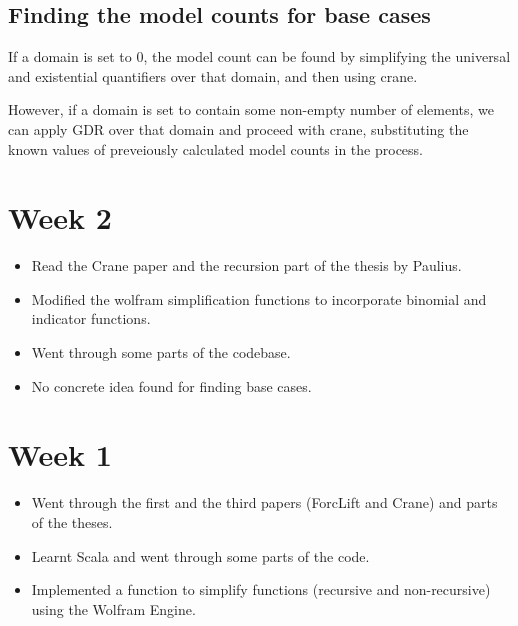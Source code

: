 \documentclass[12pt]{report}
\begin{document}
    \section*{Finding the model counts for base cases}
    If a domain is set to $0$, the model count can be found by simplifying the universal and existential quantifiers over that domain, and then using crane. 
    
    However, if a domain is set to contain some non-empty number of elements, we can apply GDR over that domain and proceed with crane, substituting the known values of preveiously calculated model counts in the process. 

    \chapter*{Week 2}

    \begin{itemize}
        \item Read the Crane paper and the recursion part of the thesis by Paulius.
        \item Modified the wolfram simplification functions to incorporate binomial and indicator functions.
        \item Went through some parts of the codebase.
        \item No concrete idea found for finding base cases.
    \end{itemize}

    \chapter*{Week 1}

    \begin{itemize}
        \item Went through the first and the third papers (ForcLift and Crane) and parts of the theses.
        \item Learnt Scala and went through some parts of the code.
        \item Implemented a function to simplify functions (recursive and non-recursive) using the Wolfram Engine. 
    \end{itemize}
\end{document}
